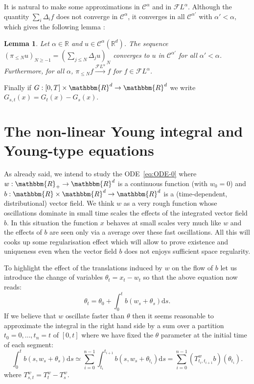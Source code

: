 \documentclass[a4paper,11pt]{article}
\newcommand{\mathd}{\mathrm{d}}
\newtheorem{lemma}[theorem]{Lemma}
\newcommand{\CC}{\mathscr C}
\newcommand{\CF}{\mathscr F}
\newcommand{\RR}{\mathbb R}
\begin{document}
It is natural to make some approximations in $\CC^{\alpha}$ and in $\CF
L^{\alpha}$. Although the quantity $\sum_{i} \Delta_{i} f$ does not converge in
$\CC^{\alpha}$, it converges in all $\CC^{\alpha'}$ with $\alpha' < \alpha$,
which gives the following lemma :

\begin{lemma}
  Let $\alpha\in\RR$ and $u\in\CC^\alpha(\RR^d)$. The sequence $( \pi_{\leqslant N} u )_{N \ge -1} = ( \sum_{j \leqslant N}
  \Delta_{j} u)_{N}$ converges to $u$ in $\CC^{\alpha'}$ for all $\alpha' <
  \alpha$. Furthermore, for all $\alpha$, $\pi_{\leqslant N} f
  \xrightarrow{\CF L^{\alpha}} f$ for $f \in \CF L^{\alpha}$.
\end{lemma}

Finally if $G: [ 0,T ] \times \mathbbm{R}^{d} \rightarrow \mathbbm{R}^{d}$ we
write $G_{s,t} ( x ) =G_{t} ( x ) -G_{s} ( x )$.

\section{The non-linear Young integral and Young-type
equations}\label{sec:young-ode}

As already said, we intend to study the ODE~{\eqref{eq:ODE-0}} where
$w:\mathbbm{R}_{+} \to \mathbbm{R}^{d}$ is a continuous function (with $w_{0}
=0$) and $b:\mathbbm{R} \times \mathbbm{R}^{d} \to \mathbbm{R}^{d}$ is a
(time-dependent, distributional) vector field. We think $w$ as a very rough
function whose oscillations dominate in small time scales the effects of the
integrated vector field $b$. In this situation the function $x$ behaves at
small scales very much like $w$ and the effects of $b$ are seen only via a
average over these fast oscillations. All this will cooks up some
regularisation effect which will allow to prove existence and uniqueness even
when the vector field $b$ does not enjoys sufficient space regularity.

To highlight the effect of the translations induced by $w$ on the flow of $b$
let us introduce the change of variables $\theta_{t} =x_{t} -w_{t}$ so that
the above equation now reads:
\[ \theta_{t} = \theta_{0} + \int_{0}^{t} b (w_{s} + \theta_{s} ) \mathd s. \]
If we believe that $w$ oscillate faster than $\theta$ then it seems reasonable
to approximate the integral in the right hand side by a sum over a partition $t_{0} =0,
\ldots ,t_{n} =t$ of $[0,t]$ where we have fixed the $\theta$ parameter at the
initial time of each segment:
\begin{equation}
  \label{eq:approx} \int_{0}^{t} b (s,w_{s} + \theta_{s} ) \mathd s \simeq
  \sum_{i=0}^{n-1} \int_{t_{i}}^{t_{i+1}} b (s,w_{s} + \theta_{t_{i}} ) \mathd
  s= \sum_{i=0}^{n-1} (T^{w}_{t_{i} ,t_{i+1}} b) ( \theta_{t_{i}} ) .
\end{equation}
where $T^{w}_{s,t} =T^{w}_{t} -T^{w}_{s}$.
\end{document}
